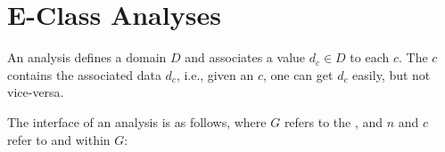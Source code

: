 



\section{E-Class Analyses}
\label{sec:analysis}

An \eclass analysis defines a domain $D$ and associates a value $d_{c} \in D$ to
  each \eclass $c$.
The \eclass $c$ contains the associated data $d_{c}$,
  i.e., given an \eclass $c$, one can get $d_{c}$ easily, but not vice-versa.

The interface of an \eclass analysis is as follows,
  where $G$ refers to the \egraph,
  and $n$ and $c$ refer to \enodes and \eclasses within $G$:


